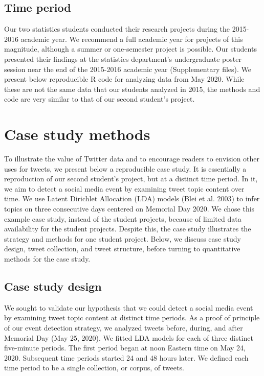 \documentclass[
]{article}
\begin{document}
\hypertarget{time-period}{%
\subsection{Time period}\label{time-period}}

Our two statistics students conducted their research projects during the 2015-2016 academic year.
We recommend a full academic year for projects of this magnitude, although a summer or one-semester
project is possible. Our students presented their findings at the statistics department's
undergraduate poster session near the end of the 2015-2016 academic year (Supplementary files). We
present below reproducible R code for analyzing data from May 2020. While these
are not the same data that our students analyzed in 2015, the methods and code
are very similar to that of our second student's project.

\hypertarget{case-study-methods}{%
\section{Case study methods}\label{case-study-methods}}

To illustrate the value of Twitter data and to encourage readers to envision other uses for tweets, we present below a
reproducible case study. It is essentially a reproduction of our second student's project, but at a
distinct time period. In it, we aim to detect a social media
event by examining tweet topic content over time. We use Latent Dirichlet
Allocation (LDA) models (Blei et al. 2003) to infer topics on three consecutive days centered
on Memorial Day 2020. We chose this example case study,
instead of the student projects, because of limited data
availability for the student projects. Despite this, the case study
illustrates the strategy and methods for one student
project. Below, we discuss case study design, tweet collection, and tweet structure,
before turning to quantitative methods for the case study.

\hypertarget{case-study-design}{%
\subsection{Case study design}\label{case-study-design}}

We sought to validate our hypothesis that we could detect a social
media event by examining tweet topic content at distinct time periods.
As a proof of principle of our event detection strategy,
we analyzed tweets before, during, and
after Memorial Day (May 25, 2020).
We fitted LDA models for each of three
distinct five-minute periods. The first period began at noon Eastern time
on May 24, 2020. Subsequent time periods started
24 and 48 hours later.
We defined each time period to be a single collection, or corpus, of
tweets.
\end{document}

